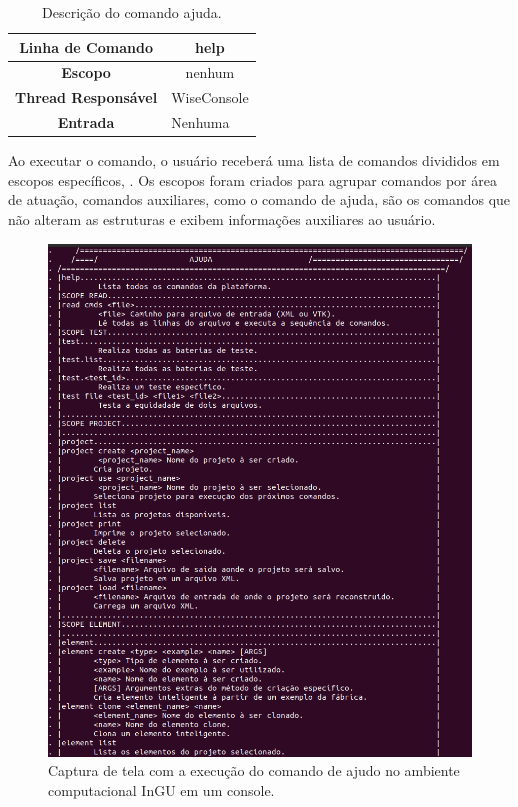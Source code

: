 \begin{center}
	\begin{table}[!htbp]
		\begin{tabularx}{\textwidth}{c|X}
			\toprule
			\textbf{Linha de Comando} & \multicolumn{1}{c}{help} \\
			\midrule
			\textbf{Escopo} & \multicolumn{1}{c}{nenhum} \\
			\hline
			\textbf{Thread Responsável} & \multicolumn{1}{c}{WiseConsole} \\
			\hline
			\textbf{Entrada} & Nenhuma \\
			\bottomrule
		\end{tabularx}
		\caption{Descrição do comando ajuda.}
		\label{tab:help}
	\end{table}
\end{center}

Ao executar o comando, o usuário receberá uma lista de comandos divididos em escopos específicos, . Os escopos foram criados para agrupar comandos por área de atuação, comandos auxiliares, como o comando de ajuda, são os comandos que não alteram as estruturas e exibem informações auxiliares ao usuário.


\begin{figure}[!htbp]
	\centering
	\includegraphics[scale=0.45]{Figures/InGU_help.png}
	\caption{Captura de tela com a execução do comando de ajudo no ambiente computacional InGU em um console.}
	\label{fig10:ajuda}
\end{figure}


